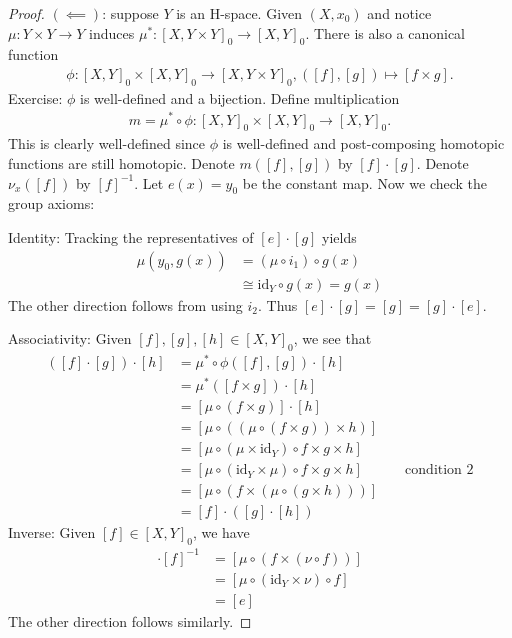 \documentclass[12pt,class=article,crop=false]{standalone}
\begin{document}
\begin{proof}
	$ (\impliedby)$: suppose $ Y$ is an H-space. Given  $ (X,x_0)$ and notice $ \mu : Y \times Y \to Y$ induces $ \mu^* : [X,Y\times Y]_0 \to [X,Y]_0$. There is also a canonical function
	\begin{align*}
	\phi:	[X,Y]_0 \times [X,Y]_0 \to [X, Y\times Y]_0, ([f],[g]) \mapsto [f \times g].
	\end{align*}
	Exercise: $ \phi$ is well-defined and a bijection. Define multiplication
	\begin{align*}
		m=\mu^*  \circ \phi : [X,Y]_0 \times [X,Y]_0 \to [X,Y]_0.
	\end{align*}
	This is clearly well-defined since $ \phi$ is well-defined and post-composing homotopic functions are still homotopic. Denote $ m([f],[g])$ by  $ [f] \cdot [g]$. Denote $ \nu_x ([f])$ by $ [f]^{-1}$. Let $ e(x)=y_0$ be the constant map. Now we check the group axioms:

	Identity: Tracking the representatives of $ [e] \cdot [g]$ yields
	\begin{align*}
		\mu(y_0,g(x)) &= (\mu \circ i_1) \circ g(x) \\
		& \cong \text{id}_Y \circ g(x) =g(x) 
	\end{align*}
	The other direction follows from using $ i_2$. Thus $ [e] \cdot  [g]= [g] = [g] \cdot  [e]$.

	Associativity: Given $ [f], [g], [h] \in [X, Y]_0$, we see that
	\begin{align*}
		([f] \cdot [g]) \cdot [h] &= \mu^* \circ \phi ([f],[g]) \cdot [h] \\
					  &= \mu^* ([f \times g]) \cdot [h]\\
					  &= [\mu \circ (f\times g)] \cdot [h] \\
					  &= [\mu \circ ( (\mu \circ (f \times g)) \times h)] \\
					  &= [\mu \circ (\mu \times \text{id}_{ Y}) \circ f\times g \times h] \\
					  &= [\mu \circ (\text{id}_{ Y}\times \mu) \circ f \times g \times h] && \text{ condition 2} \\
					  &= [\mu \circ (f \times (\mu \circ (g \times h)))] \\
					  &= [f] \cdot ([g] \cdot  [h]) 
	\end{align*}
	Inverse: Given $ [f] \in [X, Y]_0$, we have
	\begin{align*}
		[f] \cdot [f]^{-1} &= [\mu \circ (f \times (\nu \circ f))] \\
				   &= [\mu \circ (\text{id}_{ Y} \times \nu) \circ f] \\
				   &= [e]
	\end{align*}
	The other direction follows similarly.


\end{proof}
\end{document}
